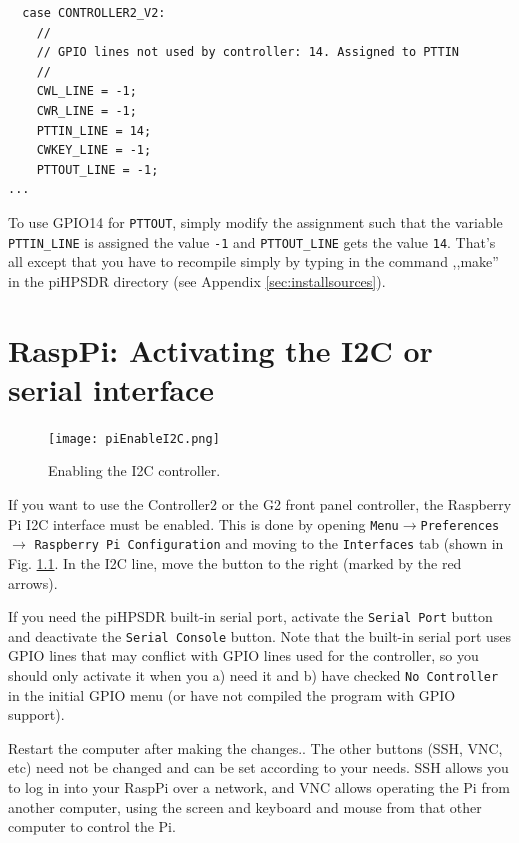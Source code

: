 \documentclass[12pt]{book}
\def\rett#1{\texttt{\color{red}#1}}
\def\pH{pi\-HPSDR\xspace}
\begin{document}
\begin{small}
\begin{verbatim}
  case CONTROLLER2_V2:
    //
    // GPIO lines not used by controller: 14. Assigned to PTTIN
    //
    CWL_LINE = -1;
    CWR_LINE = -1;
    PTTIN_LINE = 14;
    CWKEY_LINE = -1;
    PTTOUT_LINE = -1;
...
\end{verbatim}
\end{small}

To use GPIO14 for \texttt{PTTOUT}, simply modify the assignment such that the variable
 \texttt{PTTIN\_LINE} is assigned the
value \texttt{-1} and \texttt{PTTOUT\_LINE} gets the value \texttt{14}.
 That's all except that you have to recompile
simply by typing in the command ,,make'' in the \pH directory (see Appendix \ref{sec:installsources}).


\chapter[RaspPi: Activating I2C]{RaspPi: Activating the I2C or serial interface}
\label{sec:i2c}

\begin{figure}[ht]
\center
\texttt{[image: piEnableI2C.png]}
\caption{Enabling the I2C controller.}
\label{fig:piEnableI2C}
\end{figure}

If you want to use the Controller2 or the G2 front panel controller, the Raspberry Pi I2C interface
must be enabled. This is done by opening \texttt{Menu}$\to$\texttt{Preferences}$\to$
\texttt{Raspberry Pi Configuration} and moving to the \texttt{Interfaces} tab
(shown in Fig. \ref{fig:piEnableI2C}. In the I2C line, move the button to the right
(marked by the red arrows).

If you need the \pH built-in serial port, activate the \rett{Serial Port} button and deactivate
the \rett{Serial Console} button. Note that the built-in serial port uses GPIO lines that may
conflict with GPIO lines used for the controller, so
you should only activate it when you a) need it and b) have checked \rett{No Controller} in the
initial GPIO menu (or have not compiled the program with GPIO support).

Restart the computer after making the changes..
The other buttons (SSH, VNC, etc) need not be changed and can be set according to your needs. SSH allows
you to log in into your RaspPi over a network, and VNC allows operating the Pi from another computer,
using the screen and keyboard and mouse from that other computer to control the Pi.
\end{document}
